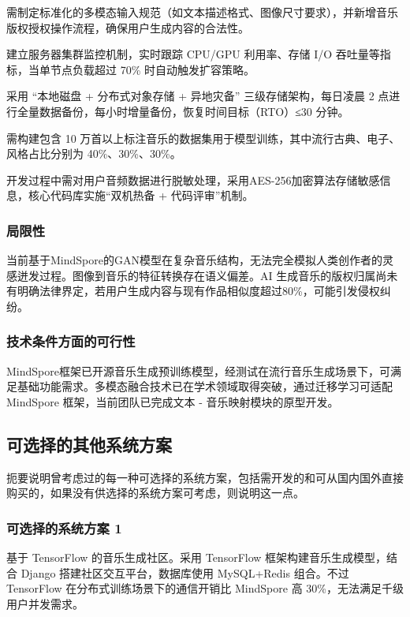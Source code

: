 \documentclass{base}
\numberwithin{figure}{section} %
\begin{document}
需制定标准化的多模态输入规范（如文本描述格式、图像尺寸要求），并新增音乐版权授权操作流程，确保用户生成内容的合法性。

建立服务器集群监控机制，实时跟踪 CPU/GPU 利用率、存储 I/O 吞吐量等指标，当单节点负载超过 70\% 时自动触发扩容策略。  

采用 “本地磁盘 + 分布式对象存储 + 异地灾备” 三级存储架构，每日凌晨 2 点进行全量数据备份，每小时增量备份，恢复时间目标（RTO）≤30 分钟。

需构建包含 10 万首以上标注音乐的数据集用于模型训练，其中流行古典、电子、风格占比分别为 40\%、30\%、30\%。

开发过程中需对用户音频数据进行脱敏处理，采用AES-256加密算法存储敏感信息，核心代码库实施“双机热备 + 代码评审”机制。

\subsubsection{局限性}

当前基于MindSpore的GAN模型在复杂音乐结构，无法完全模拟人类创作者的灵感迸发过程。图像到音乐的特征转换存在语义偏差。AI 生成音乐的版权归属尚未有明确法律界定，若用户生成内容与现有作品相似度超过80\%，可能引发侵权纠纷。

\subsubsection{技术条件方面的可行性}

MindSpore框架已开源音乐生成预训练模型，经测试在流行音乐生成场景下，可满足基础功能需求。多模态融合技术已在学术领域取得突破，通过迁移学习可适配 MindSpore 框架，当前团队已完成文本 - 音乐映射模块的原型开发。

\subsection{可选择的其他系统方案}

扼要说明曾考虑过的每一种可选择的系统方案，包括需开发的和可从国内国外直接购买的，如果没有供选择的系统方案可考虑，则说明这一点。

\subsubsection{可选择的系统方案 1}

基于 TensorFlow 的音乐生成社区。采用 TensorFlow 框架构建音乐生成模型，结合 Django 搭建社区交互平台，数据库使用 MySQL+Redis 组合。不过 TensorFlow 在分布式训练场景下的通信开销比 MindSpore 高 30\%，无法满足千级用户并发需求。
\end{document}
